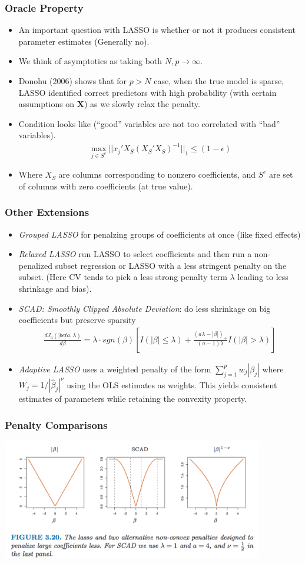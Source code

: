 \documentclass[xcolor=pdftex,dvipsnames,table,mathserif]{beamer}
\begin{document}
\begin{frame}
\frametitle{Oracle Property}
\begin{itemize}
\item An important question with LASSO is whether or not it produces consistent parameter estimates (Generally \alert{no}).
\item We think of asymptotics as taking both $N,p\rightarrow \infty$.
\item Donohu (2006) shows that for $p > N$ case, when the true model is sparse, LASSO identified correct predictors with high probability (with certain assumptions on $\mathbf{X}$) as we slowly relax the penalty.
\item Condition looks like (``good'' variables are not too correlated with ``bad'' variables).
\begin{eqnarray*}
\max_{j \in S^{c}} || x_j' X_{S} (X_{S}' X_{S})^{-1} ||_{1} \leq (1 -\epsilon) 
\end{eqnarray*}
\item Where $X_{S}$ are columns corresponding to nonzero coefficients, and $S^{c}$ are set of columns with zero coefficients (at true value).
\end{itemize}
\end{frame}


\begin{frame}
\frametitle{Other Extensions}
\begin{itemize}
\item \textit{Grouped LASSO} for penalzing groups of coefficients at once (like fixed effects)
\item \textit{Relaxed LASSO} run LASSO to select coefficients and then run a non-penalized subset regression or LASSO with a less stringent penalty on the subset. (Here CV tends to pick a less strong penalty term $\lambda$ leading to less shrinkage and bias).
\item \textit{SCAD: Smoothly Clipped Absolute Deviation}: do less shrinkage on big coefficients but preserve sparsity
\begin{eqnarray*}
\frac{ d J_a(|beta,\lambda)}{d \beta} = \lambda \cdot sgn(\beta) \left[ I(| \beta| \leq \lambda) + \frac{(a \lambda - | \beta|)_{+}}{(a-1) \lambda} I (| \beta| > \lambda) \right]
\end{eqnarray*}
\item \textit{Adaptive LASSO} uses  a weighted penalty of the form $\sum_{j=1}^p w_j |\beta_j|$ where $W_j = 1/|\hat{\beta}_j|^{\nu}$ using the OLS estimates as weights. This yields consistent estimates of parameters while retaining the convexity property.
\end{itemize}
\end{frame}

\begin{frame}
\frametitle{Penalty Comparisons}
\begin{center}
\includegraphics[width=4.5in]{./resources/lassopenalty}
\end{center}
\end{frame}
\end{document}
